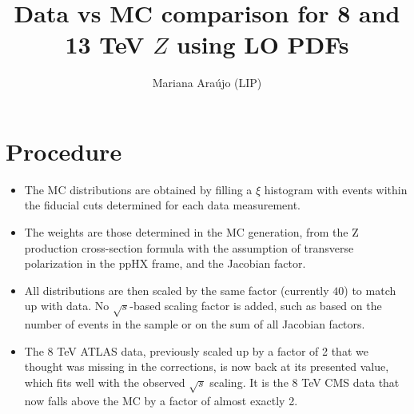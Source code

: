 \documentclass{article}
\begin{document}
\title{Data vs MC comparison for 8 and 13 TeV $Z$ using LO PDFs}
\author{Mariana Ara\'ujo (LIP)}
\maketitle

\section{Procedure}

\begin{itemize}
\item The MC distributions are obtained by filling a $\xi$ histogram with events within the fiducial cuts determined for each data measurement. 
\item The weights are those determined in the MC generation, from the Z production cross-section formula with the assumption of transverse polarization in the ppHX frame, and the Jacobian factor. 
\item All distributions are then scaled by the same factor (currently $40$) to match up with data. No $\sqrt{s}$-based scaling factor is added, such as based on the number of events in the sample or on the sum of all Jacobian factors. 
\item The 8 TeV ATLAS data, previously scaled up by a factor of 2 that we thought was missing in the corrections, is now back at its presented value, which fits well with the observed $\sqrt{s}$ scaling. It is the 8 TeV CMS data that now falls above the MC by a factor of almost exactly 2.
\end{itemize}

\clearpage

\end{document}
